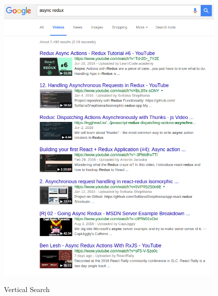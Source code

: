 \documentclass[a4paper,11pt]{article}
\begin{document}
\begin{figure}[h]
%
  {\includegraphics[scale=0.5]{googleVerticalSearch.png}}
\caption{Vertical Search}
\label{fig:vsearch}
\end{figure}
\end{document}

